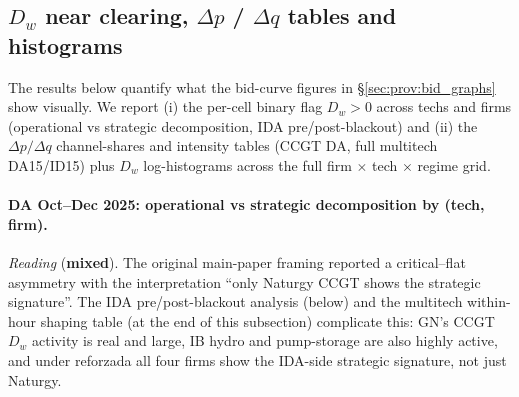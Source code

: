 \documentclass[11pt,a4paper]{article}
\begin{document}
\subsection{$D_w$ near clearing, $\Delta p$ / $\Delta q$ tables and histograms}\label{sec:prov:dw_tables}

\noindent The results below quantify what the bid-curve figures in \S\ref{sec:prov:bid_graphs} show visually. We report (i) the per-cell binary flag $D_w > 0$ across techs and firms (operational vs strategic decomposition, IDA pre/post-blackout) and (ii) the $\Delta p / \Delta q$ channel-shares and intensity tables (CCGT DA, full multitech DA15/ID15) plus $D_w$ log-histograms across the full firm $\times$ tech $\times$ regime grid.

\paragraph{DA Oct--Dec 2025: operational vs strategic decomposition by (tech, firm).}\label{sec:prov:operational_strategic}
\textit{Reading} (\textbf{mixed}). The original main-paper framing reported a critical--flat asymmetry with the interpretation ``only Naturgy CCGT shows the strategic signature''. The IDA pre/post-blackout analysis (below) and the multitech within-hour shaping table (at the end of this subsection) complicate this: GN's CCGT $D_w$ activity is real and large, IB hydro and pump-storage are also highly active, and under reforzada all four firms show the IDA-side strategic signature, not just Naturgy.
\end{document}
